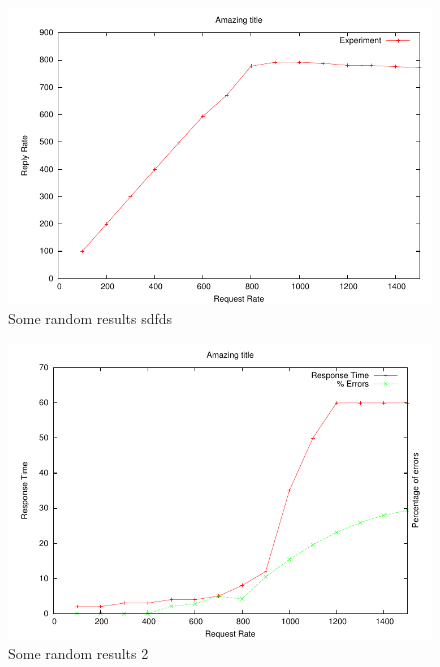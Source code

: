\documentclass[a4paper, 11pt]{article}
\begin{document}
\begin{figure}
  \begin{center}
    \includegraphics{results1.pdf}
    \caption{Some random results sdfds}
    \label{fig:results1}
  \end{center}
\end{figure}


\begin{figure}
  \begin{center}
    \includegraphics{results2.pdf}
    \caption{Some random results 2}
    \label{fig:results2}
  \end{center}
\end{figure}
\end{document}
